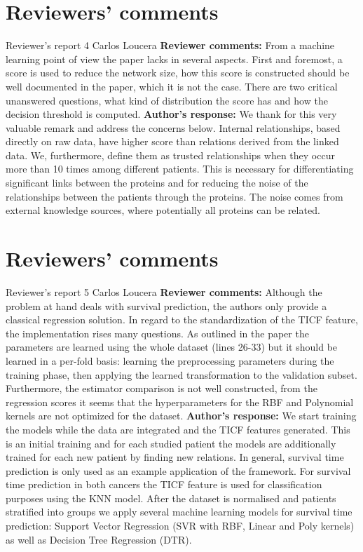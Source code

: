 \documentclass{bmcart}
\begin{document}
\begin{backmatter}
\section*{Reviewers' comments}
\newline Reviewer's report 4
\newline Carlos Loucera
\newline \textbf{Reviewer comments:}
From a machine learning point of view the paper lacks in several aspects. First and foremost, a score is used to reduce the network size, how this score is constructed should be well documented in the paper, which it is not the case. There are two critical unanswered questions, what kind of distribution the score has and how the decision threshold is computed.
\newline \textbf{Author's response:}
We thank for this very valuable remark and address the concerns below.
Internal relationships, based directly on raw data, have higher score than relations derived from the linked data. We, furthermore, define them as trusted relationships when they occur more than 10 times among different patients. This is necessary for differentiating significant links between the proteins and for reducing the noise of the relationships between the patients through the proteins. The noise comes from external knowledge sources, where potentially all proteins can be related.

\section*{Reviewers' comments}
\newline Reviewer's report 5
\newline Carlos Loucera
\newline \textbf{Reviewer comments:}
Although the problem at hand deals with survival prediction, the authors only provide a classical regression solution. 
In regard to the standardization of the TICF feature, the implementation rises many questions. As outlined in the paper the parameters are learned using the whole dataset (lines 26-33) but it should be learned in a per-fold basis: learning the preprocessing parameters during the training phase, then applying the learned transformation to the validation subset.
Furthermore, the estimator comparison is not well constructed, from the regression scores it seems that the hyperparameters for the RBF and Polynomial kernels are not optimized for the dataset.
\newline \textbf{Author's response:}
We start training the models while the data are integrated and the TICF features generated. This is an initial training and for each studied patient the models are additionally trained for each new patient by finding new relations.
In general, survival time prediction is only used as an example application of the framework. For survival time prediction in both cancers the TICF feature is used for classification purposes using the KNN model.
After the dataset is normalised and patients stratified into groups we apply several machine learning models for survival time prediction: Support  Vector Regression (SVR with RBF, Linear and Poly kernels) as well as Decision Tree Regression (DTR).



\end{backmatter}
\end{document}
